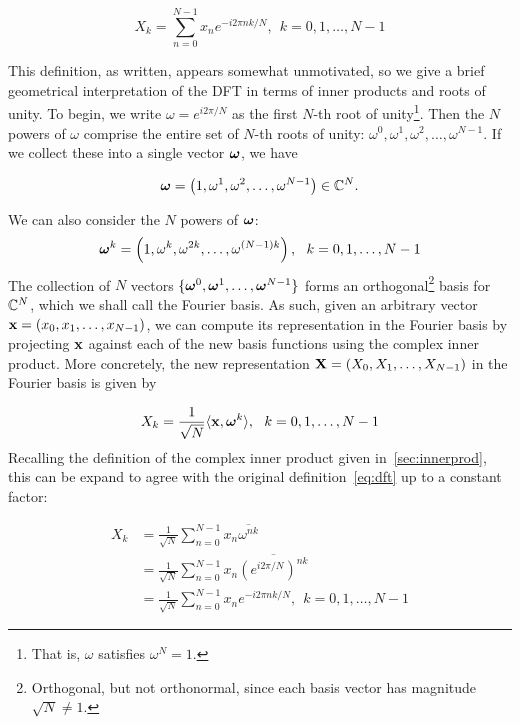 \begin{equation}
\label{eq:dft}
	X_k = \sum_{n=0}^{N-1}x_n e^{-i2\pi n k/N}, \ \ k = 0, 1, \dots, N-1
\end{equation}

This definition, as written, appears somewhat unmotivated, so we give a brief geometrical interpretation of the DFT in terms of inner products and roots of unity. 
To begin, we write $\omega = e^{i2 \pi / N}$ as the first $N$-th root of unity\footnote{That is, $\omega$ satisfies $\omega^N = 1$.}. Then the $N$ powers of $\omega$ comprise the entire set of $N$-th roots of unity: $\omega^0, \omega^1, \omega^2, \dots, \omega^{N-1}$. If we collect these into a single vector $\boldsymbol{\omega}$, we have 

\begin{equation}
	\boldsymbol{\omega} = \left(1, \omega^1, \omega^2, \dots, \omega^{N-1}\right) \in \mathbb{C}^N. 
\end{equation}

We can also consider the $N$ powers of $\boldsymbol{\omega}$:
\begin{equation}
	\boldsymbol{\omega}^k = \left(1, \omega^k, \omega^{2k}, \dots, \omega^{(N-1)k}\right), \ \ k = 0, 1, \dots, N-1
\end{equation}
The collection of $N$ vectors $\{\boldsymbol{\omega}^0, \boldsymbol{\omega}^1, \dots, \boldsymbol{\omega}^{N-1}\}$ forms an orthogonal\footnote{Orthogonal, but not orthonormal, since each basis vector has magnitude $\sqrt{N} \neq 1$.} basis for $\mathbb{C}^N$, which we shall call the Fourier basis. As such, given an arbitrary vector $\mathbf{x} = \left(x_0, x_1, \dots, x_{N-1}\right)$, we can compute its representation in the Fourier basis by projecting $\mathbf{x}$ against each of the new basis functions using the complex inner product. More concretely, the new representation $\mathbf{X} = \left(X_0, X_1, \dots, X_{N-1}\right)$ in the Fourier basis is given by 

\begin{equation}
	X_k = \frac{1}{\sqrt{N}} \langle \mathbf{x}, \boldsymbol{\omega}^k \rangle, \ \ k = 0, 1, \dots, N-1
\end{equation}
Recalling the definition of the complex inner product given in~\ref{sec:innerprod}, this can be expand to agree with the original definition~\ref{eq:dft} up to a constant factor:

\begin{align}
	X_k &= \frac{1}{\sqrt{N}}\sum_{n=0}^{N-1}x_n \overline{\omega^{nk}}\\
	        &= \frac{1}{\sqrt{N}}\sum_{n=0}^{N-1}x_n \overline{\left(e^{i 2 \pi / N}\right)^{nk}}\\
	        &= \frac{1}{\sqrt{N}}\sum_{n=0}^{N-1}x_n e^{-i2\pi n k/N}, \ \ k = 0, 1, \dots, N-1
\end{align}

